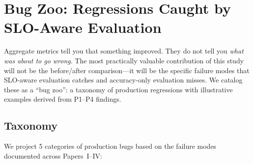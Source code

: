 \documentclass[11pt]{article}
\begin{document}
\section{Bug Zoo: Regressions Caught by SLO-Aware Evaluation}
\label{sec:bugzoo}

Aggregate metrics tell you that something improved. They do not tell you \emph{what was about to go wrong}. The most practically valuable contribution of this study will not be the before/after comparison---it will be the specific failure modes that SLO-aware evaluation catches and accuracy-only evaluation misses. We catalog these as a ``bug zoo'': a taxonomy of production regressions with illustrative examples derived from P1--P4 findings.

\subsection{Taxonomy}

We project 5 categories of production bugs based on the failure modes documented across Papers~I--IV:
\end{document}
